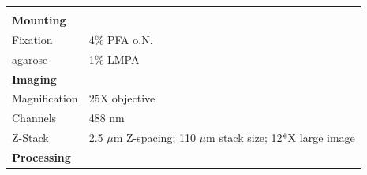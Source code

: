 \documentclass[11pt,singlespacinge,twoside]{reedthesis} %
\begin{document}
\begin{longtable}[]{@{}ll@{}}
\begin{minipage}[t]{0.73\columnwidth}
\end{minipage}\tabularnewline
\begin{minipage}[t]{0.21\columnwidth}\raggedright
\textbf{Mounting}\strut
\end{minipage} & \begin{minipage}[t]{0.73\columnwidth}\raggedright
\strut
\end{minipage}\tabularnewline
\begin{minipage}[t]{0.21\columnwidth}\raggedright
Fixation\strut
\end{minipage} & \begin{minipage}[t]{0.73\columnwidth}\raggedright
4\% PFA o.N.\strut
\end{minipage}\tabularnewline
\begin{minipage}[t]{0.21\columnwidth}\raggedright
agarose\strut
\end{minipage} & \begin{minipage}[t]{0.73\columnwidth}\raggedright
1\% LMPA\strut
\end{minipage}\tabularnewline
\begin{minipage}[t]{0.21\columnwidth}\raggedright
\textbf{Imaging}\strut
\end{minipage} & \begin{minipage}[t]{0.73\columnwidth}\raggedright
\strut
\end{minipage}\tabularnewline
\begin{minipage}[t]{0.21\columnwidth}\raggedright
Magnification\strut
\end{minipage} & \begin{minipage}[t]{0.73\columnwidth}\raggedright
25X objective\strut
\end{minipage}\tabularnewline
\begin{minipage}[t]{0.21\columnwidth}\raggedright
Channels\strut
\end{minipage} & \begin{minipage}[t]{0.73\columnwidth}\raggedright
488 nm\strut
\end{minipage}\tabularnewline
\begin{minipage}[t]{0.21\columnwidth}\raggedright
Z-Stack\strut
\end{minipage} & \begin{minipage}[t]{0.73\columnwidth}\raggedright
2.5 \(\mu\)m Z-spacing; 110 \(\mu\)m stack size; 12*X large image\strut
\end{minipage}\tabularnewline
\begin{minipage}[t]{0.21\columnwidth}\raggedright
\textbf{Processing}\strut

\end{minipage}
\end{longtable}
\end{document}
